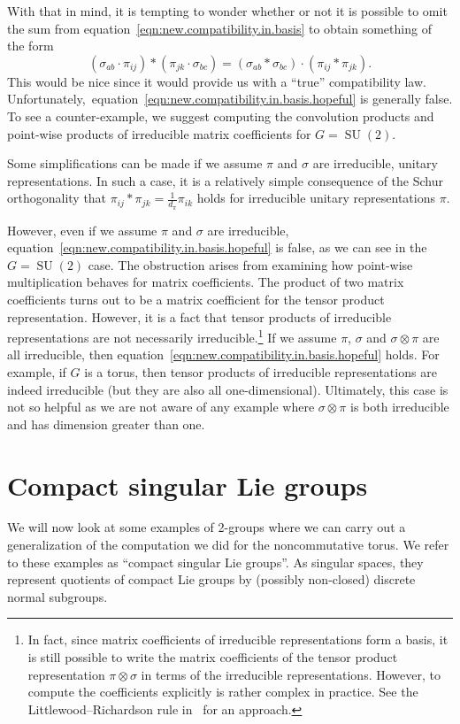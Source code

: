 \documentclass[pdftex]{sigma}
\numberwithin{equation}{section}
\theoremstyle{definition}
\DeclareMathOperator{\SU}{SU}
\begin{document}
With that in mind, it is tempting to wonder whether or not it is possible to omit the sum from equation~\eqref{eqn:new.compatibility.in.basis} to obtain something of the form
\begin{equation}\label{eqn:new.compatibility.in.basis.hopeful}
  (\sigma_{ab} \cdot \pi_{ij} ) * (\pi_{jk} \cdot \sigma_{bc}) = (\sigma_{ab} * \sigma_{bc} ) \cdot (\pi_{ij} * \pi_{jk}).
\end{equation}
This would be nice since it would provide us with a ``true'' compatibility law. Unfortunately,\ equation~\eqref{eqn:new.compatibility.in.basis.hopeful} is generally false. To see a counter-example, we suggest computing the convolution products and point-wise products of irreducible matrix coefficients for $ G = \SU(2) $.

Some simplifications can be made if we assume $ \pi $ and $ \sigma $ are irreducible, unitary representations. In such a case, it is a relatively simple consequence of the Schur orthogonality that
$ \pi_{ij} * \pi_{jk} = \frac{1}{d_\pi} \pi_{ik}$
holds for irreducible unitary representations $ \pi $.

However, even if we assume $ \pi $ and $ \sigma $ are irreducible, equation~\eqref{eqn:new.compatibility.in.basis.hopeful} is false, as we can see in the $ G= \SU(2)$ case. The obstruction arises from examining how point-wise multiplication behaves for matrix coefficients. The product of two matrix coefficients turns out to be a matrix coefficient for the tensor product representation. However, it is a fact that tensor products of irreducible representations are not necessarily irreducible.\footnote{In fact, since matrix coefficients of irreducible representations form a basis, it is still possible to write the matrix coefficients of the tensor product representation $\pi\otimes\sigma$ in terms of the irreducible representations. However, to compute the coefficients explicitly is rather complex in practice. See the Littlewood--Richardson rule in~\cite{KnappBeyond} for an approach.} If we assume $ \pi$, $\sigma $ and $ \sigma \otimes \pi$ are all irreducible, then equation~\eqref{eqn:new.compatibility.in.basis.hopeful} holds. For example, if $ G $ is a torus, then tensor products of irreducible representations are indeed irreducible (but they are also all one-dimensional). Ultimately, this case is not so helpful as we are not aware of any example where $ \sigma \otimes \pi $ is both irreducible and has dimension greater than one.

\section{Compact singular Lie groups}\label{Section:compact.singular.Lie.groups}
We will now look at some examples of 2-groups where we can carry out a generalization of the computation we did for the noncommutative torus. We refer to these examples as ``compact singular Lie groups''. As singular spaces, they represent quotients of compact Lie groups by (possibly non-closed) discrete normal subgroups.
\end{document}
